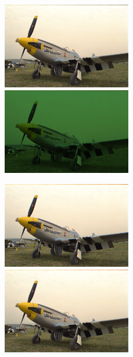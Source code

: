 {\begin{figure}
       \includegraphics[width=0.5\textwidth]{imagenes/img9.png}
           \hfill
        \includegraphics[width=0.5\textwidth]{imagenes/img9_bayer.png}
\end{figure}

\begin{figure}
       \includegraphics[width=0.5\textwidth]{imagenes/img9_demosicing_vecino.png}
           \hfill
        \includegraphics[width=0.5\textwidth]{imagenes/img9_demosicing_bilineal.png}
\end{figure}

\begin{figure}


\end{figure}}
